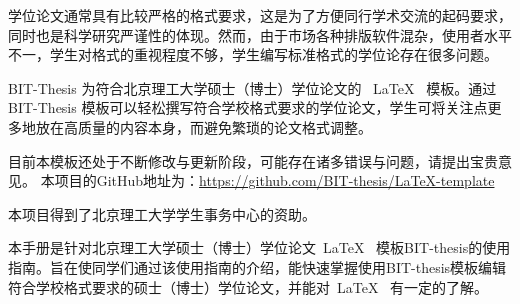 
\begin{conclusion}
学位论文通常具有比较严格的格式要求，这是为了方便同行学术交流的起码要求，同时也是科学研究严谨性的体现。然而，由于市场各种排版软件混杂，使用者水平不一，学生对格式的重视程度不够，学生编写标准格式的学位论存在很多问题。

BIT-Thesis 为符合北京理工大学硕士（博士）学位论文的 ~\LaTeX~ 模板。通过 BIT-Thesis 模板可以轻松撰写符合学校格式要求的学位论文，学生可将关注点更多地放在高质量的内容本身，而避免繁琐的论文格式调整。

目前本模板还处于不断修改与更新阶段，可能存在诸多错误与问题，请提出宝贵意见。
本项目的GitHub地址为：\url{https://github.com/BIT-thesis/LaTeX-template}

本项目得到了北京理工大学学生事务中心的资助。

本手册是针对北京理工大学硕士（博士）学位论文~\LaTeX~ 模板BIT-thesis的使用指南。旨在使同学们通过该使用指南的介绍，能快速掌握使用BIT-thesis模板编辑符合学校格式要求的硕士（博士）学位论文，并能对~\LaTeX~ 有一定的了解。

\end{conclusion}
